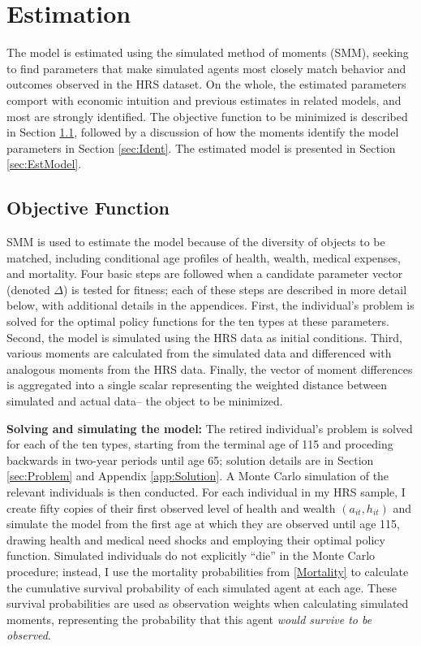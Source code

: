\documentclass[12pt,pdftex,letterpaper]{article}
\newcommand{\Health}{h}
\newcommand{\Assets}{a}
\begin{document}
\section{Estimation}
\label{sec:Est}

The model is estimated using the simulated method of moments (SMM), seeking to find parameters that make simulated agents most closely match behavior and outcomes observed in the HRS dataset.  On the whole, the estimated parameters comport with economic intuition and previous estimates in related models, and most are strongly identified.  The objective function to be minimized is described in Section \ref{sec:ObjFunc}, followed by a discussion of how the moments identify the model parameters in Section \ref{sec:Ident}. The estimated model is presented in Section \ref{sec:EstModel}.

\subsection{Objective Function}
\label{sec:ObjFunc}

SMM is used to estimate the model because of the diversity of objects to be matched, including conditional age profiles of health, wealth, medical expenses, and mortality.  Four basic steps are followed when a candidate parameter vector (denoted $\Delta$) is tested for fitness; each of these steps are described in more detail below, with additional details in the appendices.  First, the individual's problem is solved for the optimal policy functions for the ten types at these parameters.  Second, the model is simulated using the HRS data as initial conditions.  Third, various moments are calculated from the simulated data and differenced with analogous moments from the HRS data.  Finally, the vector of moment differences is aggregated into a single scalar representing the weighted distance between simulated and actual data-- the object to be minimized.

\vspace{0.5cm}

\noindent \textbf{Solving and simulating the model:} The retired individual's problem is solved for each of the ten types, starting from the terminal age of 115 and proceding backwards in two-year periods until age 65; solution details are in Section \ref{sec:Problem} and Appendix \ref{app:Solution}.  A Monte Carlo simulation of the relevant individuals is then conducted.  For each individual in my HRS sample, I create fifty copies of their first observed level of health and wealth $(\Assets_{it},\Health_{it})$ and simulate the model from the first age at which they are observed until age 115, drawing health and medical need shocks and employing their optimal policy function.  Simulated individuals do not explicitly ``die'' in the Monte Carlo procedure; instead, I use the mortality probabilities from \eqref{Mortality} to calculate the cumulative survival probability of each simulated agent at each age.  These survival probabilities are used as observation weights when calculating simulated moments, representing the probability that this agent \textit{would survive to be observed}.
\end{document}
